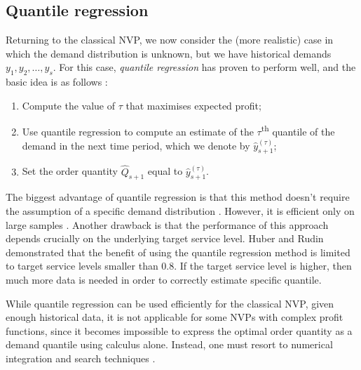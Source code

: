 \documentclass[a4paper,11pt]{article}
\begin{document}
\subsection{Quantile regression} \label{sub:lit3}

Returning to the classical NVP, we now consider the (more realistic) case in which the demand distribution is unknown, but we have historical demands $y_1,y_2,\dots,y_s$.
For this case, \emph{quantile regression}
has proven to perform well, and the basic idea is as follows \cite{BT06,Br16,CS19,HNS15,Hu19}:
\begin{enumerate}
\item Compute the value of $\tau$ that maximises expected profit;
\item Use quantile regression to compute an estimate of the $\tau$\textsuperscript{th} quantile of the demand in the next time period, which we denote by $\hat{y}_{s+1}^{(\tau)}$;
\item Set the order quantity $\hat{Q}_{s+1}$ equal to $\hat{y}_{s+1}^{(\tau)}$.
\end{enumerate}

The biggest advantage of quantile regression is that this method doesn't require the assumption of a specific demand distribution \cite{Hu19}. However, it is efficient only on large samples \cite{RV19,Hu19}. Another drawback is that the performance of this approach depends crucially on the underlying target service level. Huber \cite{Hu19} and Rudin \cite{RV19} demonstrated that the benefit of using the quantile regression method is limited to target service levels smaller than 0.8. If the target service level is higher, then much more data is needed in order to correctly estimate specific quantile.

While quantile regression can be used efficiently for the classical NVP, given enough historical data, it is not applicable for some NVPs with complex profit functions, since it becomes impossible to express the optimal order quantity as a demand quantile using calculus alone. Instead, one must resort to numerical integration and search techniques \cite{SW81}.


\end{document}
